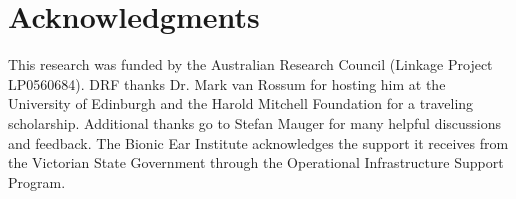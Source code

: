 \documentclass[11pt,draftcls,onecolumn]{IEEEtran}
\begin{document}
\section*{Acknowledgments}
This research was funded by the Australian Research Council (Linkage Project LP0560684). DRF thanks Dr. Mark van Rossum for hosting him at the University of Edinburgh and the Harold Mitchell Foundation for a traveling scholarship. Additional thanks go to Stefan Mauger for many helpful discussions and feedback. The Bionic Ear Institute acknowledges the support it receives from the Victorian State Government through the Operational Infrastructure Support Program. 







%

% 
% 
% 
% 
% 
% 

\end{document}
